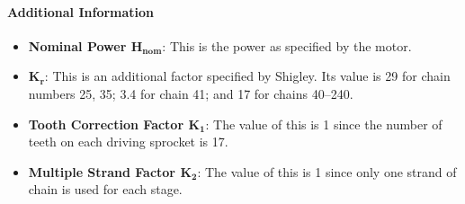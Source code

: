 \documentclass[letterpaper,12pt]{article}
\begin{document}
\paragraph{Additional Information}
\begin{itemize}
    \itemsep0em
    \item \textbf{Nominal Power $\bm{H_{\text{nom}}}$}: This is the power as specified by the motor.
    \item $\bm{K_r}$: This is an additional factor specified by Shigley. Its value is 29 for chain numbers 25, 35; 3.4 for chain 41; and 17 for chains 40–240.
    \item \textbf{Tooth Correction Factor $\bm{K_1}$}: The value of this is 1 since the number of teeth on each driving sprocket is 17.
    \item \textbf{Multiple Strand Factor $\bm{K_2}$}: The value of this is 1 since only one strand of chain is used for each stage.
\end{itemize}
\end{document}
